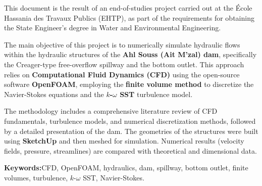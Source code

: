 This document is the result of an end-of-studies project carried out at the École Hassania des Travaux Publics (EHTP), as part of the requirements for obtaining the State Engineer's degree in Water and Environmental Engineering.

The main objective of this project is to numerically simulate hydraulic flows within the hydraulic structures of the \textbf{Ahl Souss (Ait M'zal) dam}, specifically the Creager-type free-overflow spillway and the bottom outlet. This approach relies on \textbf{Computational Fluid Dynamics (CFD)} using the open-source software \textbf{OpenFOAM}, employing the \textbf{finite volume method} to discretize the Navier-Stokes equations and the \textbf{$k$-$\omega$ SST} turbulence model.

The methodology includes a comprehensive literature review of CFD fundamentals, turbulence models, and numerical discretization methods, followed by a detailed presentation of the dam. The geometries of the structures were built using \textbf{SketchUp} and then meshed for simulation. Numerical results (velocity fields, pressure, streamlines) are compared with theoretical and dimensional data.

\vspace{0.5cm}
\noindent\hrulefill

\noindent\textbf{Keywords:}\quad CFD, OpenFOAM, hydraulics, dam, spillway, bottom outlet, finite volumes, turbulence, $k$-$\omega$ SST, Navier-Stokes.

\noindent\hrulefill
\vspace{0.3cm}

\newpage
